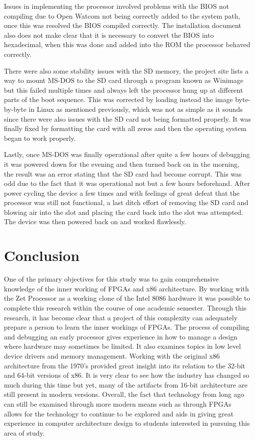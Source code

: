 \documentclass[pdftex,10.5pt]{report}
\begin{document}
Issues in implementing the processor involved problems with the BIOS not compiling due to Open Watcom not being correctly added to the system path, once this was resolved the BIOS compiled correctly. The installation document also does not make clear that it is necessary to convert the BIOS into hexadecimal, when this was done and added into the ROM the processor behaved correctly. 

There were also some stability issues with the SD memory, the project site lists a way to mount MS-DOS to the SD card through a program known as Winimage but this failed multiple times and always left the processor hung up at different parts of the boot sequence. This was corrected by loading instead the image byte-by-byte in Linux as mentioned previously, which was not as simple as it sounds since there were also issues with the SD card not being formatted properly. It was finally fixed by formatting the card with all zeros and then the operating system began to work properly.

Lastly, once MS-DOS was finally operational after quite a few hours of debugging it was powered down for the evening and then turned back on in the morning, the result was an error stating that the SD card had become corrupt. This was odd due to the fact that it was operational not but a few hours beforehand. After power cycling the device a few times and with feelings of great defeat that the processor was still not functional, a last ditch effort of removing the SD card and blowing air into the slot and placing the card back into the slot was attempted. The device was then powered back on and worked flawlessly.

\section{Conclusion}
One of the primary objectives for this study was to gain comprehensive knowledge of the inner working of FPGAs and x86 architecture. By working with the Zet Processor as a working clone of the Intel 8086 hardware it was possible to complete this research within the course of one academic semester. Through this research, it has become clear that a project of this complexity can adequately prepare a person to learn the inner workings of FPGAs. The process of compiling and debugging an early processor gives experience in how to manage a design where hardware may sometimes be limited. It also examines topics in low level device drivers and memory management. Working with the original x86 architecture from the 1970's provided great insight into its relation to the 32-bit and 64-bit versions of x86. It is very clear to see how the industry has changed so much during this time but yet, many of the artifacts from 16-bit architecture are still present in modern versions. Overall, the fact that technology from long ago can still be examined through more modern means such as through FPGAs allows for the technology to continue to be explored and aids in giving great experience in computer architecture design to students interested in pursuing this area of study.
\end{document}
